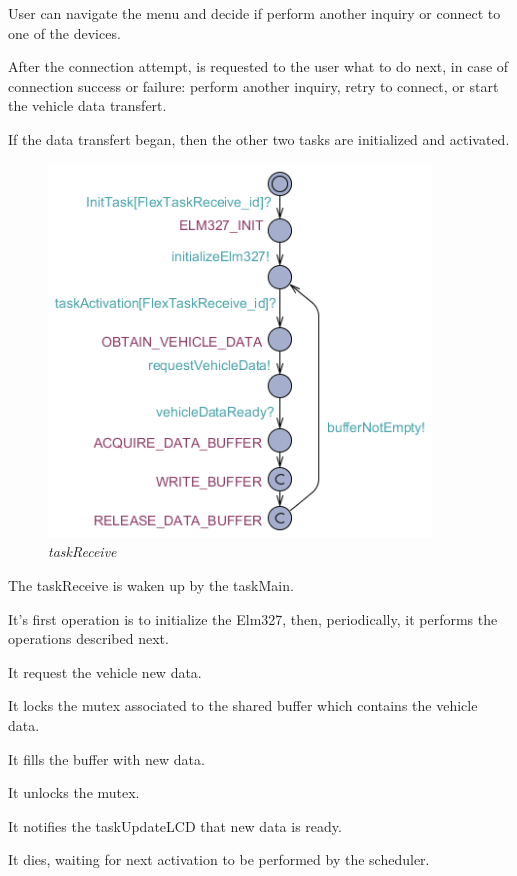 \documentclass[paper=a4, fontsize=11pt]{scrartcl} %
\numberwithin{equation}{section} %
\numberwithin{figure}{section} %
\numberwithin{table}{section} %
\begin{document}
User can navigate the menu and decide if perform another inquiry or connect to one of the devices.

After the connection attempt, is requested to the user what to do next, in case of connection success or failure: perform another inquiry, retry to connect, or start the vehicle data transfert.

If the data transfert began, then the other two tasks are initialized and activated.

\begin{figure}[H]
  \centering
  \includegraphics[width=4in]{img/FLEX-OBD-LCD_taskReceive}
  \caption{\textit{taskReceive}}
\end{figure}

The taskReceive is waken up by the taskMain.

It's first operation is to initialize the Elm327, then, periodically, it performs the operations described next.

It request the vehicle new data.

It locks the mutex associated to the shared buffer which contains the vehicle data.

It fills the buffer with new data.

It unlocks the mutex.

It notifies the taskUpdateLCD that new data is ready.

It dies, waiting for next activation to be performed by the scheduler.
\end{document}
